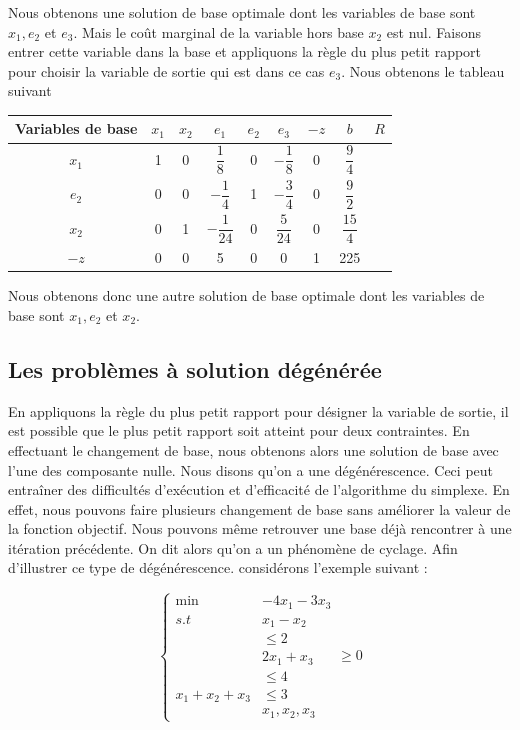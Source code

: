 \documentclass[a4paper,12pt,openany]{book}
\theoremstyle{plain}
\theoremstyle{definition}
\theoremstyle{remark}
\theoremstyle{nbstyle}
\begin{document}
	Nous obtenons une solution de base optimale dont les variables de base sont $x_{1}, e_{2}$ et $e_{3}$. Mais le coût marginal de la variable hors base $x_{2}$ est nul. Faisons entrer cette variable dans la base et appliquons la règle du plus petit rapport pour choisir la variable de sortie qui est dans ce cas $e_{3}$. Nous obtenons le tableau suivant
	
	\begin{center}
		\begin{tabular}{|c|cccccc|c|c|}
			\hline
			Variables de base & $x_{1}$ & $x_{2}$ & $e_{1}$ & $e_{2}$ & $e_{3}$ & $-z$ & $b$ & $R$ \\
			\hline
			$x_{1}$ & 1 & 0 & $\dfrac{1}{8}$ & 0 & $-\dfrac{1}{8}$ & 0 & $\dfrac{9}{4}$ &  \\
			$e_{2}$ & 0 & 0 & $-\dfrac{1}{4}$ & 1 & $-\dfrac{3}{4}$ & 0 & $\dfrac{9}{2}$ &  \\
			$x_{2}$ & 0 & 1 & $-\dfrac{1}{24}$ & 0 & $\dfrac{5}{24}$ & 0 & $\dfrac{15}{4}$ &  \\
			\hline
			$-z$ & 0 & 0 & 5 & 0 & 0 & 1 & 225 &  \\
			\hline
		\end{tabular}
	\end{center}
	
	Nous obtenons donc une autre solution de base optimale dont les variables de base sont $x_{1}, e_{2}$ et $x_{2}$.
	
	\subsection{Les problèmes à solution dégénérée}
	En appliquons la règle du plus petit rapport pour désigner la variable de sortie, il est possible que le plus petit rapport soit atteint pour deux contraintes. En effectuant le changement de base, nous obtenons alors une solution de base avec l'une des composante nulle. Nous disons qu'on a une dégénérescence. Ceci peut entraîner des difficultés d'exécution et d'efficacité de l'algorithme du simplexe. En effet, nous pouvons faire plusieurs changement de base sans améliorer la valeur de la fonction objectif. Nous pouvons même retrouver une base déjà rencontrer à une itération précédente. On dit alors qu'on a un phénomène de cyclage. Afin d'illustrer ce type de dégénérescence. considérons l'exemple suivant :
	
	$$
	\left\{\begin{array}{rl}
	\displaystyle\min & -4 x_{1}-3 x_{3} \\
	s . t & x_{1}-x_{2} \\
	& \leq 2 \\
	& 2 x_{1}+x_{3} \\
	& \leq 4 \\
	x_{1}+x_{2}+x_{3} & \leq 3 \\
	& x_{1}, x_{2}, x_{3}
	\end{array} \geq 0\right.
	$$
	
\end{document}

